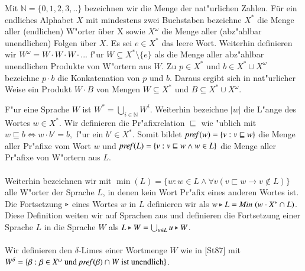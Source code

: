 Mit $\mathbb{N}=\{0,1,2,3,..\}$ bezeichnen wir die Menge der nat"urlichen Zahlen. 
Für ein endliches Alphabet $X$ mit mindestens zwei Buchstaben bezeichne $X^*$ die Menge aller (endlichen) W"orter über X sowie $X^\omega$ die Menge aller (abz"ahlbar unendlichen) Folgen über $X$.
Es sei $e\in X^*$ das leere Wort. Weiterhin definieren wir $W^\omega = W\cdot W\cdot W \cdot ...$ f"ur $W\subseteq X^*\setminus \{e\}$ als die Menge aller abz"ahlbar unendlichen Produkte von W"ortern aus $W$.
Zu $p\in X^*$ und $b\in X^*\cup X^\omega$ bezeichne $p\cdot b$ die Konkatenation von $p$ und $b$. Daraus ergibt sich in nat"urlicher Weise ein Produkt $W\cdot B$ von Mengen $W\subseteq X^*$ und $B\subseteq X^*\cup X^\omega$.

F"ur eine Sprache $W$ ist $W^*=\bigcup_{i\in\mathbb{N}} W^i$. Weiterhin bezeichne $\vert w\vert$ die L"ange des Wortes $w\in X^*$.
Wir definieren die Pr"afixrelation $\sqsubseteq$ wie "ublich mit $w\sqsubseteq b \Leftrightarrow w\cdot b' = b,$ f"ur ein $b'\in X^*$.
Somit bildet $\mathit{pref{(}}w) = \{v:v\sqsubseteq w\}$ die Menge aller Pr"afixe vom Wort $w$ und $\mathit{pref{(}}L) = \{v:v\sqsubseteq w \wedge w\in L\}$ die Menge aller Pr"afixe von W"ortern aus $L$.\\\\
Weiterhin bezeichnen wir mit $\min(L) = \{w:w\in L \wedge \forall v( v\sqsubset w \to v\notin L)\}$ alle W"orter der Sprache $L$, in denen kein Wort Pr"afix eines anderen Wortes ist.
Die Fortsetzung $\triangleright$ eines Wortes $w$ in $L$ definieren wir als $w\triangleright L = \mathit{Min}\;(w\cdot X^* \cap L)$. Diese Definition weiten wir auf Sprachen aus und definieren
die Fortsetzung einer Sprache $L$ in die Sprache $W$ als $L\triangleright W = \bigcup_{u\in L} u\triangleright W$.\\\\
Wir definieren den $\delta$-Limes einer Wortmenge $W$ wie in [St87] mit\\$W^\delta = \{\beta : \beta \in X^\omega \text{ und }\mathit{pref{(}}\beta)\cap W \text{ ist unendlich}\}$.
